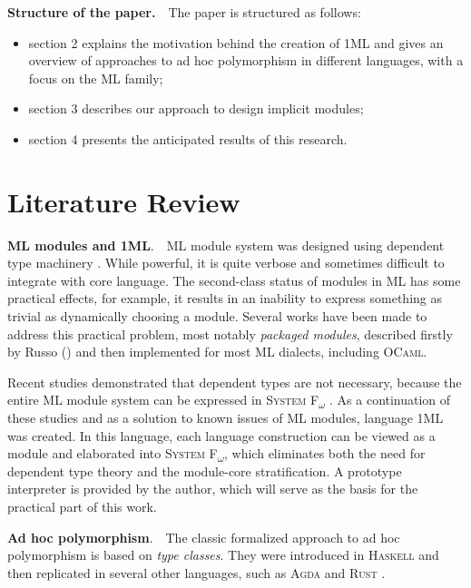 \documentclass{spbau-diploma}
\begin{document}
\textbf{Structure of the paper.}~~The paper is structured as follows:
\begin{itemize}
\item section 2 explains the motivation behind the creation of \textsc{1ML} and gives an overview of approaches to ad hoc polymorphism in different languages, with a focus on the ML family;
\item section 3 describes our approach to design implicit modules;
\item section 4 presents the anticipated results of this research.
\end{itemize}

\section{Literature Review}

\textbf{\textsc{ML} modules and \textsc{1ML}}.~~\textsc{ML} module system was designed using dependent type machinery \citep{dependent_types}. While powerful, it is quite verbose and sometimes difficult to integrate with core language. The second-class status of modules in \textsc{ML} has some practical effects, for example, it results in an inability to express something as trivial as dynamically choosing a module. Several works have been made to address this practical problem, most notably \textit{packaged modules}, described firstly by Russo (\citeyear{packaged}) and then implemented for most \textsc{ML} dialects, including \textsc{OCaml}.

Recent studies demonstrated that dependent types are not necessary, because the entire \textsc{ML} module system can be expressed in \textsc{System F\textsubscript{$\omega$}} \citep{fing}. As a continuation of these studies and as a solution to known issues of \textsc{ML} modules, language \textsc{1ML} \citep{1ml} was created. In this language, each language construction can be viewed as a module and elaborated into \textsc{System F\textsubscript{$\omega$}}, which eliminates both the need for dependent type theory and the module-core stratification. A prototype interpreter is provided by the author, which will serve as the basis for the practical part of this work.

\textbf{Ad hoc polymorphism}.~~The classic formalized approach to ad hoc polymorphism is based on \textit{type classes}. They were introduced in \textsc{Haskell} \citep{adhoc} and then replicated in several other languages, such as \textsc{Agda} \citep{agda} and \textsc{Rust} \citep{rust}. 
\end{document}
